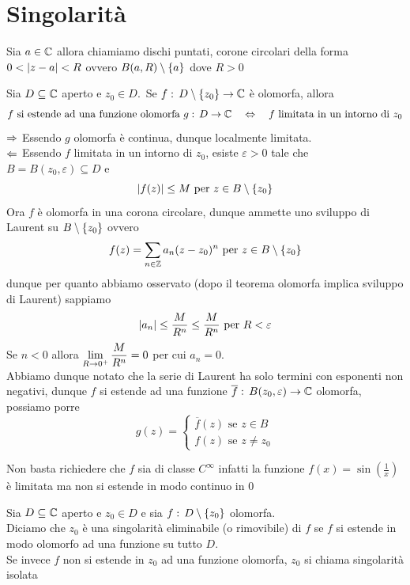 \section{Singolarit\`a }
\begin{defn}Sia $a\in \mathbb{C}$ allora chiamiamo dischi puntati, corone circolari della forma $0< \left\vert z-a \right\vert < R$ ovvero $B(a,R)\setminus \left\{ a \right\} $ dove $R>0$
\end{defn}
\begin{thm}Sia $D\subseteq \mathbb{C}$ aperto e $z_0\in D$.\
Se $f:\, D\setminus \left\{ z_0 \right\} \to \mathbb{C}$ \`e olomorfa, allora
$$ f\text{ si estende ad una funzione olomorfa } g:\, D \to \mathbb{C} \quad \Leftrightarrow \quad f \text{ limitata in un intorno di } z_0$$
\proof $\Rightarrow$ Essendo $g$ olomorfa \`e continua, dunque localmente limitata.\\
$\Leftarrow$ Essendo $f$ limitata in un intorno di $z_0$, esiste $\varepsilon>0$ tale che $B = B(z_0, \varepsilon) \subseteq D$ e 
$$ \left\vert f(z) \right\vert \leq M \text{ per } z\in B \setminus \left\{ z_0 \right\}$$
Ora $f$ \`e olomorfa in una corona circolare, dunque ammette uno sviluppo di Laurent su $B \setminus \left\{ z_0 \right\}$ ovvero 
$$ f(z) = \sum_{n \in \mathbb{Z}} a_n (z-z_0)^n \text{ per } z\in B \setminus \left\{ z_0 \right\}$$
dunque per quanto abbiamo osservato (dopo il teorema olomorfa implica sviluppo di Laurent) sappiamo 
$$ \left\vert a_n \right\vert \leq \frac{M}{R^n} \leq \frac{M}{R^n} \text{ per } R<\varepsilon$$
Se $n<0$ allora $\displaystyle \lim_{R\to 0^+} \frac{M}{R^n}=0$ per cui $a_n=0$.\\
Abbiamo dunque notato che la serie di Laurent ha solo termini con esponenti non negativi, dunque $f$ si estende ad una funzione $\overline{f}:\, B(z_0, \varepsilon)\to \mathbb{C}$ olomorfa, possiamo porre
$$ g(z) = \begin{cases}\overline{f}(z) \text{ se } z\in B \\
f(z) \text{ se } z\neq z_0
\end{cases}$$
\end{thm}
\begin{oss}Non basta richiedere che $f$ sia di classe $C^\infty$ infatti la funzione $f(x)=\sin\left(\frac{1}{x}\right)$ \`e limitata ma non si estende in modo continuo in $0$
\end{oss}
\spazio
\begin{defn}Sia $D\subseteq \mathbb{C}$ aperto e $z_0\in D$ e 
sia $f:\, D \setminus \left\{ z_0 \right\}$ olomorfa.\\
Diciamo che $z_0$ \`e una singolarit\`a eliminabile (o rimovibile)  di $f$ se $f$ si estende in modo olomorfo ad una funzione su tutto $D$.\\
Se invece $f$ non si estende in $z_0$  ad una funzione olomorfa, $z_0$ si chiama singolarit\`a isolata
\end{defn}
